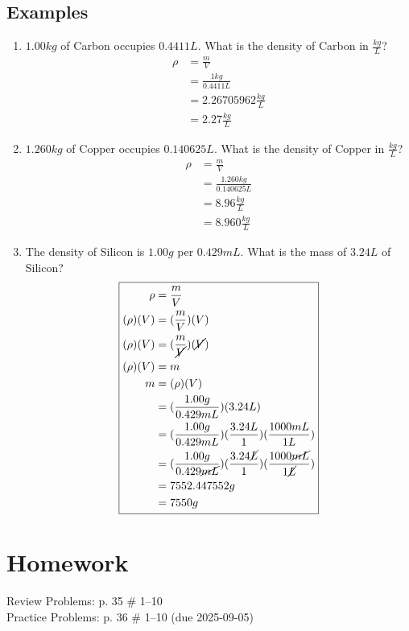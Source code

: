 \documentclass[11pt, oneside]{article}   	%
\begin{document}
\subsection{Examples}
 \begin{enumerate}[label=Example \arabic*]
 \item $1.00 kg$ of Carbon occupies $0.4411 L$. What is the density of Carbon in $\frac{kg}{L}$?
 \begin{equation}
 \boxed{
\begin{split}
	\rho &= \frac{m}{V} \\
	       &= \frac{1 kg}{0.4411 L} \\
	       &= 2.26705962 \frac{kg}{L} \\
	       &= 2.27 \frac{kg}{L} 
 \end{split}
 }
 \end{equation}
 
  \item $1.260 kg$ of Copper occupies $ 0.140625 L$. What is the density of Copper in $\frac{kg}{L}$?
  \begin{equation}
 \boxed{
\begin{split}
	\rho &= \frac{m}{V} \\
	       &= \frac{1.260 kg}{0.140625 L} \\
	       &= 8.96 \frac{kg}{L} \\
	       &= 8.960 \frac{kg}{L} 
 \end{split}
 }
 \end{equation}
 
\item The density of Silicon is $1.00 g$ per $ 0.429 mL$. What is the mass of $3.24 L$ of Silicon?
\begin{equation}
\boxed{
\begin{split}
	\rho         &= \frac{m}{V} \\
	(\rho)(V)  &= ( \frac{m}{V} )(V) \\
        (\rho)(V)  &= ( \frac{m}{\cancel{V}} ) (\cancel{V}) \\
        (\rho)(V)  &= m \\
                 m  &= (\rho)(V) \\
                      &= (\frac{1.00 g}{0.429 mL}) (3.24 L) \\           
                      &= (\frac{1.00 g}{0.429 mL}) (\frac{3.24 L}{1}) (\frac{1000 mL}{1 L}) \\
                      &= (\frac{1.00 g}{0.429 \cancel{mL}}) (\frac{3.24 \cancel{L}}{1}) (\frac{1000 \cancel{mL}}{1 \cancel{L}}) \\
                      &= 7552.447552 g \\
                      &= 7550 g
 \end{split}
 }
 \end{equation}
 \end{enumerate}


\section{Homework}
Review Problems: p. 35 \# 1--10\\
Practice Problems: p. 36 \# 1--10 (due 2025-09-05)\\



{}

\end{document}
